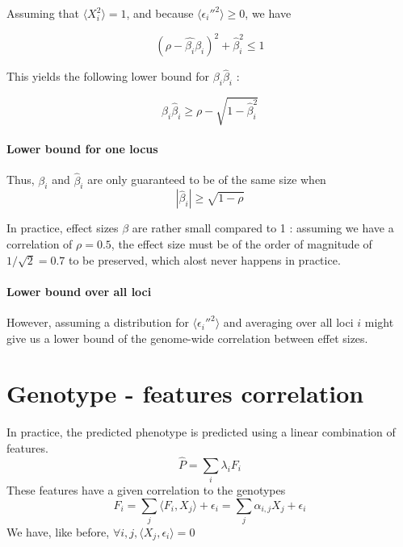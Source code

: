\documentclass{article}
\begin{document}
Assuming that $\langle X_i^2 \rangle = 1$, and because $ \langle \epsilon_i''^2 \rangle \geq 0 $, we have

\begin{equation}
(\rho - \hat{\beta_i}\beta_i)^2 + \hat{\beta}_i^2 \leq 1
\end{equation}

This yields the following lower bound for $\beta_i \hat{\beta}_i$ :

\begin{equation}
\boxed{\beta_i \hat{\beta}_i \geq \rho - \sqrt{1-\hat{\beta}_i^2}}
\label{eq:lowboundlocal}
\end{equation}

\paragraph{Lower bound for one locus} Thus, $\beta_i$ and $\hat{\beta}_i$ are only guaranteed to be of the same size when 
\begin{equation}
|\hat{\beta}_i| \geq \sqrt{1-\rho}
\end{equation}

In practice, effect sizes $\beta$ are rather small compared to 1 : assuming we have a correlation of $\rho = 0.5$, the effect size must be of the order of magnitude of $1/\sqrt{2} = 0.7$ to be preserved, which alost never happens in practice.

\paragraph{Lower bound over all loci} However, assuming a distribution for $\langle \epsilon_i''^2 \rangle$ and averaging over all loci $i$ might give us a lower bound of the genome-wide correlation between effet sizes.

\section{Genotype - features correlation}

In practice, the predicted phenotype is predicted using a linear combination of features.
\begin{equation}
\hat{P} = \sum_i \lambda_i F_i
\end{equation}
These features have a given correlation to the genotypes
\begin{equation}
F_i = \sum_j \langle F_i, X_j \rangle + \epsilon_i = \sum_j \alpha_{i,j} X_j + \epsilon_i
\end{equation}
We have, like before, $\forall i,j,  \langle X_j, \epsilon_i \rangle = 0$
\end{document}
